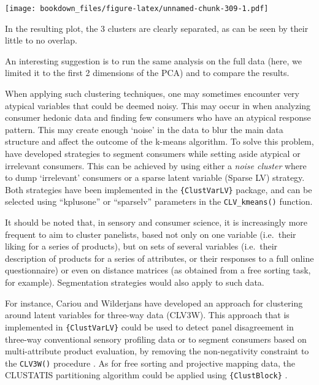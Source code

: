 \documentclass[
]{krantz}
\renewenvironment{quote}{\begin{VF}}{\end{VF}}
\begin{document}
\texttt{[image: bookdown\_files/figure-latex/unnamed-chunk-309-1.pdf]}

In the resulting plot, the 3 clusters are clearly separated, as can be seen by their little to no overlap.

\begin{quote}
An interesting suggestion is to run the same analysis on the full data (here, we limited it to the first 2 dimensions of the PCA) and to compare the results.
\end{quote}

When applying such clustering techniques, one may sometimes encounter very atypical variables that could be deemed noisy. This may occur in when analyzing consumer hedonic data and finding few consumers who have an atypical response pattern. This may create enough `noise' in the data to blur the main data structure and affect the outcome of the k-means algorithm. To solve this problem, \citet{vigneau2016} have developed strategies to segment consumers while setting aside atypical or irrelevant consumers. This can be achieved by using either a \emph{noise cluster} where to dump `irrelevant' consumers or a sparse latent variable (Sparse LV) strategy. Both strategies have been implemented in the \texttt{\{ClustVarLV\}} package, and can be selected using ``kplusone'' or ``sparselv'' parameters in the \texttt{CLV\_kmeans()} function.

It should be noted that, in sensory and consumer science, it is increasingly more frequent to aim to cluster panelists, based not only on one variable (i.e.~their liking for a series of products), but on sets of several variables (i.e.~their description of products for a series of attributes, or their responses to a full online questionnaire) or even on distance matrices (as obtained from a free sorting task, for example). Segmentation strategies would also apply to such data.

For instance, Cariou and Wilderjans have developed an approach for clustering around latent variables for three-way data (CLV3W). This approach that is implemented in \texttt{\{ClustVarLV\}} could be used to detect panel disagreement in three-way conventional sensory profiling data \citep{wilderjans2016} or to segment consumers based on multi-attribute product evaluation, by removing the non-negativity constraint to the \texttt{CLV3W()} procedure \citep{cariou2018}. As for free sorting and projective mapping data, the CLUSTATIS partitioning algorithm could be applied using \texttt{\{ClustBlock\}} \citep[\citet{llobell2020}]{llobell2019}.
\end{document}
